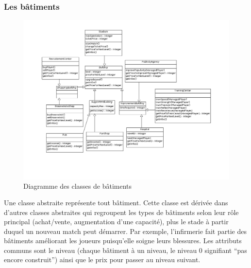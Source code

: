 \documentclass[a4paper,titlepage]{scrreprt}
\begin{document}
\begin{itemize}
  \subsubsection{Les bâtiments}
    \begin{figure}[H]
    \center
    \includegraphics[scale=0.4]{uml/class/DiagrammedeclassesBuildings.png}
    \caption{Diagramme des classes de bâtiments}
    \end{figure}	
  Une classe abstraite représente tout bâtiment. Cette classe est dérivée dans d'autres classes abstraites
  qui regroupent les types de bâtiments selon leur rôle principal (achat/vente, augmentation
  d'une capacité), plus le stade à partir duquel un nouveau match peut démarrer. Par exemple, l'\gls{infirmerie} fait partie des bâtiments
  améliorant les joueurs puisqu'elle soigne leurs blessures.
  Les attributs communs sont le niveau (chaque bâtiment à un niveau, le niveau 0
  signifiant \enquote{pas encore construit}) ainsi que le prix pour passer au niveau suivant.

\end{itemize}
\end{document}
